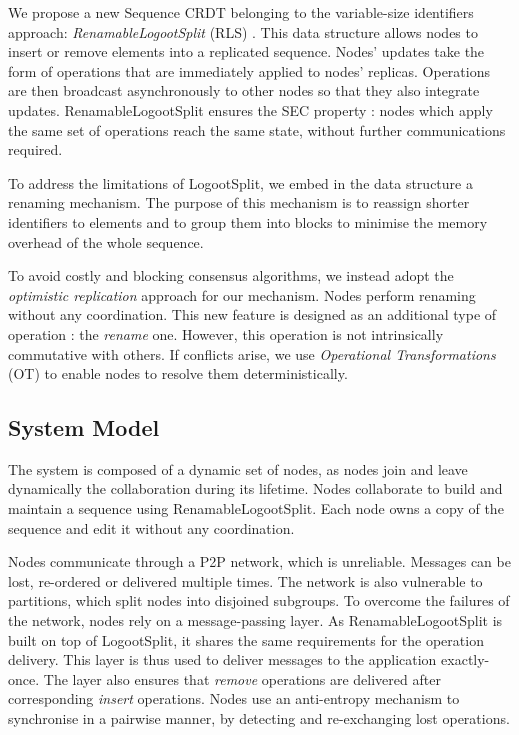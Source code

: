 \documentclass[10pt,journal,compsoc]{IEEEtran}
\begin{document}
We propose a new Sequence \ac{CRDT} belonging to the variable-size identifiers approach: \emph{RenamableLogootSplit} (RLS) \cite{nicolas:hal-01932552,nicolas:hal-02526724}.
This data structure allows nodes to insert or remove elements into a replicated sequence.
Nodes' updates take the form of operations that are immediately applied to nodes' replicas.
Operations are then broadcast asynchronously to other nodes so that they also integrate updates.
RenamableLogootSplit ensures the \ac{SEC} property \cite{shapiro_2011_crdt} : nodes which apply the same set of operations reach the same state, without further communications required.

To address the limitations of LogootSplit, we embed in the data structure a renaming mechanism.
The purpose of this mechanism is to reassign shorter identifiers to elements and to group them into blocks to minimise the memory overhead of the whole sequence.

To avoid costly and blocking consensus algorithms, we instead adopt the \emph{optimistic replication} \cite{10.1145/1057977.1057980} approach for our mechanism.
Nodes perform renaming without any coordination.
This new feature is designed as an additional type of operation : the \emph{rename} one.
However, this operation is not intrinsically commutative with others.
If conflicts arise, we use \emph{Operational Transformations} (OT) \cite{10.1145/67544.66963,10.1145/289444.289469,4668339} to enable nodes to resolve them deterministically.

\subsection{System Model}

The system is composed of a dynamic set of nodes, as nodes join and leave dynamically the collaboration during its lifetime.
Nodes collaborate to build and maintain a sequence using RenamableLogootSplit.
Each node owns a copy of the sequence and edit it without any coordination.

Nodes communicate through a \ac{P2P} network, which is unreliable.
Messages can be lost, re-ordered or delivered multiple times.
The network is also vulnerable to partitions, which split nodes into disjoined subgroups.
To overcome the failures of the network, nodes rely on a message-passing layer.
As RenamableLogootSplit is built on top of LogootSplit, it shares the same requirements for the operation delivery.
This layer is thus used to deliver messages to the application exactly-once.
The layer also ensures that \emph{remove} operations are delivered after corresponding \emph{insert} operations.
Nodes use an anti-entropy mechanism \cite{10.1109/TSE.1983.236733} to synchronise in a pairwise manner, by detecting and re-exchanging lost operations.
\end{document}
